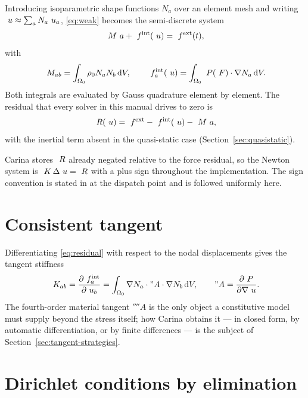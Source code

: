 Introducing isoparametric shape functions $N_a$ over an element mesh and
writing $~u \approx \sum_a N_a ~u_a$, \eqref{eq:weak} becomes the
semi-discrete system
\begin{equation}
  ~M ~a + ~f^{\mathrm{int}}(~u) = ~f^{\mathrm{ext}}(t),
  \label{eq:semidiscrete}
\end{equation}
with
\begin{equation}
  ~M_{ab} = \int_{\Omega_0} \rho_0 N_a N_b \, \mathrm{d}V,
  \qquad
  ~f^{\mathrm{int}}_a(~u) = \int_{\Omega_0} ~P(~F) \cdot \nabla N_a \, \mathrm{d}V .
\end{equation}
Both integrals are evaluated by Gauss quadrature element by element.  The
residual that every solver in this manual drives to zero is
\begin{equation}
  ~R(~u) = ~f^{\mathrm{ext}} - ~f^{\mathrm{int}}(~u) - ~M~a ,
  \label{eq:residual}
\end{equation}
with the inertial term absent in the quasi-static case
(Section~\ref{sec:quasistatic}).

\begin{remark}
Carina stores $~R$ already negated relative to the force residual, so the
Newton system is $~K\,\Delta~u = ~R$ with a plus sign throughout the
implementation.  The sign convention is stated in  at
the dispatch point and is followed uniformly here.
\end{remark}

\section{Consistent tangent}

Differentiating \eqref{eq:residual} with respect to the nodal displacements
gives the tangent stiffness
\begin{equation}
  ~K_{ab} = \frac{\partial ~f^{\mathrm{int}}_a}{\partial ~u_b}
             = \int_{\Omega_0} \nabla N_a \cdot "A \cdot \nabla N_b \,
               \mathrm{d}V,
  \qquad
  "A = \frac{\partial ~P}{\partial \nabla~u} .
  \label{eq:tangent}
\end{equation}
The fourth-order material tangent $\fourth{A}$ is the only object a
constitutive model must supply beyond the stress itself; how Carina obtains it
--- in closed form, by automatic differentiation, or by finite differences ---
is the subject of Section~\ref{sec:tangent-strategies}.

\section{Dirichlet conditions by elimination}
\label{sec:elimination}

